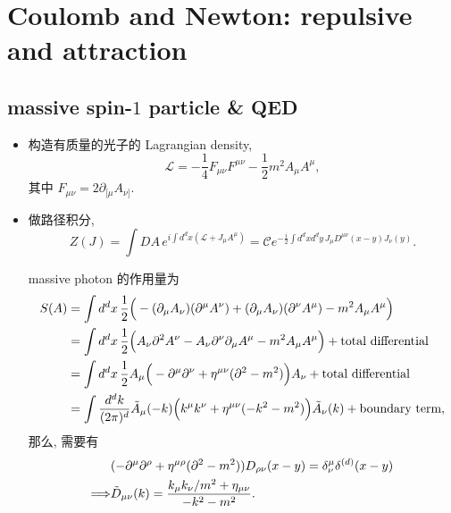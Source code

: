 \chapter{Coulomb and Newton: repulsive and attraction}
\section{massive spin-\texorpdfstring{$1$}{1} particle \& QED}
\begin{itemize}
	\item 构造有质量的光子的 Lagrangian density,
	\begin{equation} \label{2.1.1}
		\mathcal{L} = - \frac{1}{4} F_{\mu \nu} F^{\mu \nu} - \frac{1}{2} m^2 A_\mu A^\mu,
	\end{equation}
	其中 $F_{\mu \nu} = 2 \partial_{[\mu} A_{\nu]}$.
	
	\item 做路径积分,
	\begin{equation}
		Z(J) = \int DA \, e^{i \int d^d x (\mathcal{L} + J_\mu A^\mu)} = \mathcal{C} e^{- \frac{i}{2} \int d^d x d^d y \, J_\mu D^{\mu \nu}(x - y) J_\nu(y)}.
	\end{equation}
	
	\begin{tcolorbox}[title=calculation:]
		massive photon 的作用量为
		\begin{align}
			S(A) &= \int d^d x \, \frac{1}{2} \Big( - (\partial_\mu A_\nu) (\partial^\mu A^\nu) + (\partial_\mu A_\nu) (\partial^\nu A^\mu) - m^2 A_\mu A^\mu \Big) \notag \\
			&= \int d^d x \, \frac{1}{2} \Big( A_\nu \partial^2 A^\nu - A_\nu \partial^\nu \partial_\mu A^\mu - m^2 A_\mu A^\mu \Big) + \text{total differential} \notag \\
			&= \int d^d x \, \frac{1}{2} A_\mu \Big( - \partial^\mu \partial^\nu + \eta^{\mu \nu} (\partial^2 - m^2) \Big) A_\nu + \text{total differential} \notag \\
			&= \int \frac{d^d k}{(2 \pi)^d} \tilde{A}_\mu(- k) \Big( k^\mu k^\nu + \eta^{\mu \nu} (- k^2 - m^2) \Big) \tilde{A}_\nu(k) + \text{boundary term},
		\end{align}
		那么, 需要有
		\begin{align}
			& (- \partial^\mu \partial^\rho + \eta^{\mu \rho} (\partial^2 - m^2)) D_{\rho \nu}(x - y) = \delta^\mu_\nu \delta^{(d)}(x - y) \notag \\
			\Longrightarrow & \tilde{D}_{\mu \nu}(k) = \frac{k_\mu k_\nu / m^2 + \eta_{\mu \nu}}{- k^2 - m^2}.
		\end{align}
	\end{tcolorbox}
	

\end{itemize}

